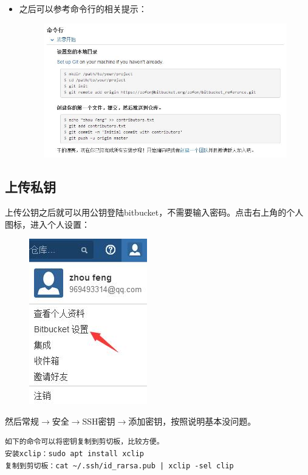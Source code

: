 \documentclass[a4paper,12pt]{ctexart}
\begin{document}
\begin{itemize}
  \item 之后可以参考命令行的相关提示：
        \begin{figure}[H]
        \centering
        \includegraphics[width=15cm]{figures/create_reponsity_3.jpg}
        \end{figure}
\end{itemize}

\subsection{上传私钥}
上传公钥之后就可以用公钥登陆bitbucket，不需要输入密码。点击右上角的个人图标，进入个人设置：
\begin{figure}[H]
  \centering
  \includegraphics{figures/ssh_set_1.jpg}\\
\end{figure}
然后常规$\rightarrow$安全$\rightarrow$SSH密钥$\rightarrow$添加密钥，按照说明基本没问题。\\
\begin{verbatim}
如下的命令可以将密钥复制到剪切板，比较方便。
安装xclip：sudo apt install xclip
复制到剪切板：cat ~/.ssh/id_rarsa.pub | xclip -sel clip
\end{verbatim}
\end{document}
